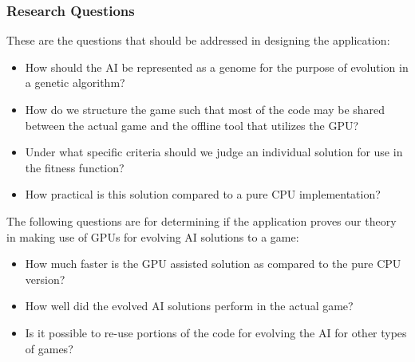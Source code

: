 \subsubsection*{Research Questions}
These are the questions that should be addressed in designing the application:

\begin{itemize}
 \item How should the AI be represented as a genome for the purpose of evolution in a genetic algorithm?

 \item How do we structure the game such that most of the code may be shared between
the actual game and the offline tool that utilizes the GPU?

 \item Under what specific criteria should we judge an individual solution for use in the
fitness function?

 \item How practical is this solution compared to a pure CPU implementation?
\end{itemize}


The following questions are for determining if the application proves our theory
in making use of GPUs for evolving AI solutions to a game:

\begin{itemize}
 \item How much faster is the GPU assisted solution as compared to the pure CPU
 version?
 
 \item How well did the evolved AI solutions perform in the actual game?
 
 \item Is it possible to re-use portions of the code for evolving the AI for other
 types of games?
\end{itemize}